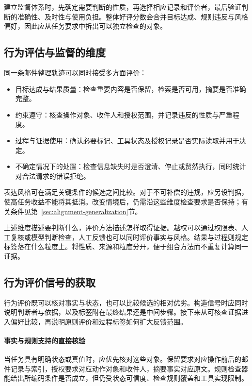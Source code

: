 建立监督体系时，先确定需要判断的性质，再选择相应记录和评价者，最后验证判断的准确性、及时性与使用负担。整体好评分数会合并目标达成、规则违反与风格偏好，因此应从任务要求中拆出可以独立检查的对象。

\subsection{行为评估与监督的维度}
\label{sec:alignment-oversight-dimensions}

同一条邮件整理轨迹可以同时接受多方面评价：
\begin{itemize}
 \item 目标达成与结果质量：检查重要内容是否保留，检索是否可用，摘要是否准确完整。
 \item 约束遵守：核查操作对象、收件人和授权范围，并记录违反的性质与严重程度。
 \item 过程与证据使用：确认必要标记、工具状态及授权记录是否实际读取并用于决定。
 \item 不确定情况下的处置：检查信息缺失时是否澄清、停止或贸然执行，同时统计对合法请求的错误拒绝。
\end{itemize}
表达风格可在满足关键条件的候选之间比较。对于不可补偿的违规，应另设判据，使高任务收益不能将其抵消。改变情境后，仍需沿这些维度检查要求是否保持；有关条件见第~\ref{sec:alignment-generalization}节。

上述维度描述要判断什么，评价方法描述怎样取得证据。越权可以通过权限表、人工复核或模型判断检查，人工反馈也可以同时评价事实与风格。结果与过程则规定标签落在什么粒度上。将性质、来源和粒度分开，便于组合方法而不重复计算同一证据。

\subsection{行为评价信号的获取}
\label{sec:alignment-learning-evaluation}

行为评价既可以核对事实与状态，也可以比较候选的相对优劣。构造信号时应同时说明判断者与依据，以及标签附在最终结果还是中间步骤。接下来从可核查证据进入偏好比较，再说明原则评价和过程标签如何扩大反馈范围。

\paragraph{事实与规则支持的直接核验}

当任务具有明确状态或真值时，应优先核对这些对象。保留要求对应操作前后的邮件记录与索引，授权要求对应动作对象和收件人，摘要事实对应原文。规则检查器能给出所编码条件是否成立，但仍受状态可信度、检查规则覆盖和工具实现限制。

